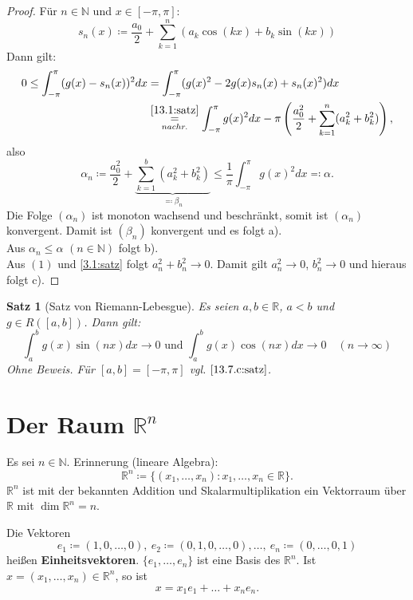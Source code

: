 \documentclass[12pt]{extreport} %
\newcommand{\N}{\mathbb{N}}
\newcommand{\R}{\mathbb{R}}
\theoremstyle{named}
\theoremstyle{itshape}
\newtheorem{satz}[unnamedtheorem]{Satz}
\theoremstyle{normal}
\begin{document}
{\begin{proof}
	Für $n \in \N$ und $x \in [-\pi, \pi]$:
		$$ s_{n}(x) \coloneqq \frac{a_{0}}{2} + \sum_{k=1}^{n} (a_{k} \cos(kx) + b_{k} \sin(kx)) $$
	Dann gilt: 
	\begin{align*}
		0 \leq \int_{-\pi}^{\pi} (g(x) - s_{n}(x))^{2} dx & = \int_{-\pi}^{\pi} (g(x)^{2} - 2g(x) s_{n}(x) + s_{n}(x)^{2} ) dx \\
		  & \overset{\ref{13.1:satz}}{\underset{nachr.}{=}} \int_{-\pi}^{\pi} g(x)^{2} dx - \pi \left( \frac{a_{0}^{2}}{2} + \sum_{k=1}^{n} ( a_{k}^{2} + b_{k}^{2}) \right),
	\end{align*}
	also
	$$ \alpha_{n} \coloneqq \frac{a_{0}^{2}}{2} + \underbrace{\sum_{k=1}^{b}(a_{k}^{2} + b_{k}^{2})}_{\eqqcolon \beta_{n}} 
	\leq \frac{1}{\pi} \int_{-\pi}^{\pi} g(x)^{2} dx \eqqcolon \alpha.$$
	Die Folge $(\alpha_{n})$ ist monoton wachsend und beschränkt, somit ist $(\alpha_{n})$ konvergent. Damit ist $(\beta_{n})$ konvergent und es folgt a). \\
	Aus $\alpha_{n} \leq \alpha$ $(n \in \N)$ folgt b). \\
	Aus $(1)$ und \ref{3.1:satz} folgt $a_{n}^{2} + b_{n}^{2} \rightarrow 0$. Damit gilt $a_{n}^{2} \rightarrow 0$, $b_{n}^2 \rightarrow 0$ und hieraus folgt c).
\end{proof}


\begin{satz}[Satz von Riemann-Lebesgue] \label{13.8:prop-SatzVonRiemann-Lebesgue}
	Es seien $a, b \in \R$, $a < b$ und $g \in R([a, b])$. Dann gilt:
		$$ \int_{a}^{b} g(x) \sin(nx) dx \rightarrow 0 \text{ und } \int_{a}^{b} g(x) \cos(nx) dx \rightarrow 0 \quad (n \rightarrow \infty) $$
		Ohne Beweis. Für $[a, b] = [-\pi, \pi]$ vgl. $\ref{13.7.c:satz}$.
\end{satz}

\newpage

\chapter{\texorpdfstring{Der Raum $\R^{n}$}{Der Raum Rn}}
Es sei $n \in \N$. Erinnerung (lineare Algebra):
$$\R^{n} \coloneqq \{ (x_{1}, \dotsc, x_{n}) : x_{1}, \dotsc, x_{n} \in \R \}.$$
$\R^{n}$ ist mit der bekannten Addition und Skalarmultiplikation ein Vektorraum über $\R$ mit $\dim \R^{n} = n$.

Die Vektoren 
$$e_{1} \coloneqq (1, 0, \dotsc, 0), ~ e_{2} \coloneqq (0, 1, 0, \dotsc, 0), \dotsc, ~ e_{n} \coloneqq (0, \dotsc, 0, 1)$$
hei{\ss}en \textbf{Einheitsvektoren}.
$\{ e_{1}, \dotsc, e_{n} \}$ ist eine Basis des $\R^{n}$. Ist $x = (x_{1}, \dotsc, x_{n}) \in \R^{n}$, so ist
$$ x = x_{1} e_{1} + \dotsc + x_{n} e_{n}. $$

}
\end{document}
